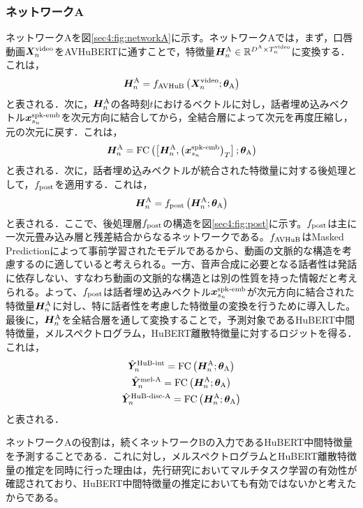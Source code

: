 \subsubsection{ネットワークA}
ネットワークAを図\ref{sec4:fig:networkA}に示す。ネットワークAでは，まず，口唇動画$\bm{X}^{\text{video}}_{n}$をAVHuBERTに通すことで，特徴量$\bm{H}^{\text{A}}_{n} \in \mathbb{R}^{D^{\text{A}} \times T^{\text{video}}_{n}}$に変換する．これは，
\begin{equation}
    \bm{H}^{\text{A}}_{n} = f_{\text{AVHuB}}\left(\bm{X}^{\text{video}}_{n}; \bm{\theta}_{\text{A}}\right)
\end{equation}
と表される．次に，$\bm{H}^{\text{A}}_{n}$の各時刻$t$におけるベクトルに対し，話者埋め込みベクトル$\bm{x}^{\text{spk-emb}}_{s_{n}}$を次元方向に結合してから，全結合層によって次元を再度圧縮し，元の次元に戻す．これは，
\begin{equation}
    \bm{H}^{\text{A}}_{n} = \text{FC}\left(\left[\bm{H}^{\text{A}}_{n}, \left(\bm{x}^{\text{spk-emb}}_{s_{n}}\right)_{T}\right]; \bm{\theta}_{\text{A}}\right)
\end{equation}
と表される．次に，話者埋め込みベクトルが統合された特徴量に対する後処理として，$f_{\text{post}}$を適用する．これは，
\begin{equation}
    \bm{H}^{\text{A}}_{n} = f_{\text{post}}\left(\bm{H}^{\text{A}}_{n}; \bm{\theta}_{\text{A}}\right)
\end{equation}
と表される．ここで、後処理層$f_{\text{post}}$の構造を図\ref{sec4:fig:post}に示す。$f_{\text{post}}$は主に一次元畳み込み層と残差結合からなるネットワークである。$f_{\text{AVHuB}}$はMasked Predictionによって事前学習されたモデルであるから、動画の文脈的な構造を考慮するのに適していると考えられる。一方、音声合成に必要となる話者性は発話に依存しない、すなわち動画の文脈的な構造とは別の性質を持った情報だと考えられる。よって、$f_{\text{post}}$は話者埋め込みベクトル$\bm{x}^{\text{spk-emb}}_{s_{n}}$が次元方向に結合された特徴量$\bm{H}^{\text{A}}_{n}$に対し、特に話者性を考慮した特徴量の変換を行うために導入した。最後に，$\bm{H}^{\text{A}}_{n}$を全結合層を通して変換することで，予測対象であるHuBERT中間特徴量，メルスペクトログラム，HuBERT離散特徴量に対するロジットを得る．これは，
\begin{gather}
    \hat{\bm{Y}}^{\text{HuB-int}}_{n} = \text{FC}\left(\bm{H}^{\text{A}}_{n}; \bm{\theta}_{\text{A}}\right) \\
    \hat{\bm{Y}}^{\text{mel-A}}_{n} = \text{FC}\left(\bm{H}^{\text{A}}_{n}; \bm{\theta}_{\text{A}}\right) \\
    \hat{\bm{Y}}^{\text{HuB-disc-A}}_{n} = \text{FC}\left(\bm{H}^{\text{A}}_{n}; \bm{\theta}_{\text{A}}\right)
\end{gather}
と表される．

ネットワークAの役割は，続くネットワークBの入力であるHuBERT中間特徴量を予測することである．これに対し，メルスペクトログラムとHuBERT離散特徴量の推定を同時に行った理由は，先行研究\cite{kim2023lip_multitask,choi2023intelligible}においてマルチタスク学習の有効性が確認されており、HuBERT中間特徴量の推定においても有効ではないかと考えたからである。

